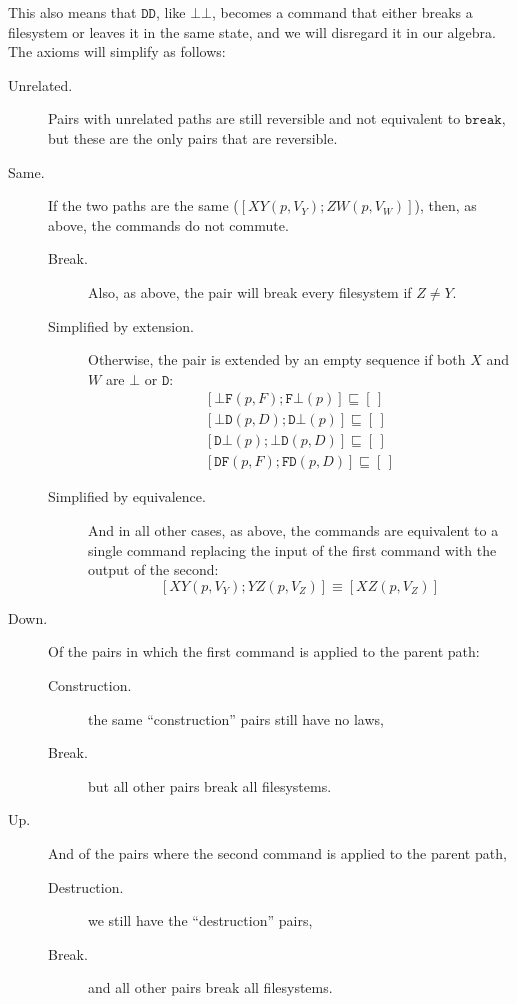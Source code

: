 \documentclass[12pt]{article}
\newcommand{\empt}{\bot}
\newcommand{\cbrk}{\mathtt{break}}
\newcommand{\fscommand}[2]{{#1#2}}
\newcommand{\fsregcommandchar}[1]{\mathtt{#1}}
\newcommand{\fsregcommand}[2]{\fscommand{\fsregcommandchar{#1}}{\fsregcommandchar{#2}}}
\newcommand{\cbb}{\fsregcommand{\empt}{\empt}}
\newcommand{\cbf}{\fsregcommand{\empt}{F}}
\newcommand{\cbd}{\fsregcommand{\empt}{D}}
\newcommand{\cfb}{\fsregcommand{F}{\empt}}
\newcommand{\cfd}{\fsregcommand{F}{D}}
\newcommand{\cdb}{\fsregcommand{D}{\empt}}
\newcommand{\cdf}{\fsregcommand{D}{F}}
\newcommand{\cdd}{\fsregcommand{D}{D}}
\newcommand{\cxy}{\fscommand{X}{Y}}
\newcommand{\cyz}{\fscommand{Y}{Z}}
\newcommand{\cxz}{\fscommand{X}{Z}}
\newcommand{\czw}{\fscommand{Z}{W}}
\newcommand{\eqext}{\sqsubseteq}
\newcommand{\emptyseq}{[\,]}
\theoremstyle{definition}
\begin{document}
This also means that $\cdd$, like $\cbb$, becomes a command that either breaks a filesystem
or leaves it in the same state, and we will disregard it in our algebra.
The axioms will simplify as follows:

\begin{description}
\item[Unrelated.] Pairs with unrelated paths are still reversible and not equivalent to
$\cbrk$, but these are the only pairs that are reversible.
%
\item[Same.] If the two paths are the same ($[\cxy(p,V_Y); \czw(p,V_W)]$), then,
as above, the commands do not commute.
   \begin{description}
   \item[Break.] Also, as above, the pair will break every filesystem if $Z\ne Y$.
   \item[Simplified by extension.] Otherwise, the pair is extended by an empty sequence
   if both $X$ and $W$ are $\fsregcommandchar{\empt}$ or $\fsregcommandchar{D}$:
   \begin{gather*}
            [\cbf(p, F); \cfb(p)] \eqext \emptyseq \\
            [\cbd(p, D); \cdb(p)] \eqext \emptyseq \\
            [\cdb(p); \cbd(p, D)] \eqext \emptyseq \\
            [\cdf(p, F); \cfd(p, D)] \eqext \emptyseq
   \end{gather*}
   \item[Simplified by equivalence.]
   And in all other cases, as above, the commands are equivalent to a single command
   replacing the input of the first command with the output of the second:
   \[ [\cxy(p, V_Y); \cyz(p, V_Z)] \equiv [\cxz(p, V_Z)] \]
   \end{description}
%
\item[Down.]
Of the pairs in which the first command is applied to the parent path:
   \begin{description}
   \item[Construction.] the same ``construction'' pairs still have no laws, 
   \item[Break.] but all other pairs break all filesystems.
   \end{description}
%
\item[Up.]
And of the pairs where the second command
is applied to the parent path,
   \begin{description}
   \item[Destruction.] we still have the ``destruction'' pairs,
   \item[Break.] and all other pairs break all filesystems.
   \end{description}
\end{description}
\end{document}
